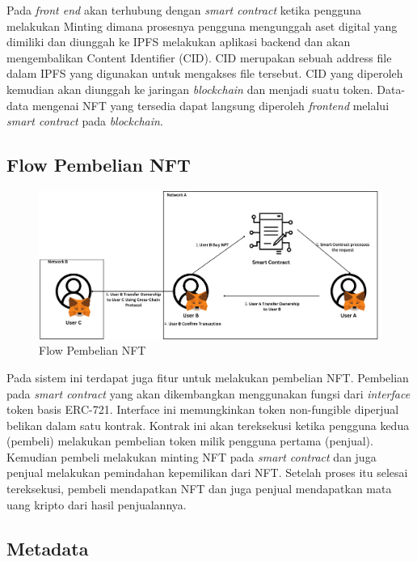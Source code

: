 Pada \emph{front end} akan terhubung dengan \emph{smart contract} ketika pengguna melakukan Minting dimana prosesnya pengguna mengunggah aset digital yang dimiliki dan diunggah ke IPFS melakukan aplikasi backend dan akan mengembalikan Content Identifier (CID). CID merupakan sebuah address file dalam IPFS yang digunakan untuk mengakses file tersebut. CID yang diperoleh kemudian akan diunggah ke jaringan \emph{blockchain} dan menjadi suatu token. Data-data mengenai NFT yang tersedia dapat langsung diperoleh \emph{frontend} melalui \emph{smart contract} pada \emph{blockchain}. 


\subsection{Flow Pembelian NFT}
\begin{figure} [H] \centering
  \includegraphics[scale=0.22]{gambar/flow_transaksi_new.png}
  \caption{Flow Pembelian NFT}
  \label{fig:flowtransaksi}
\end{figure}

Pada sistem ini terdapat juga fitur untuk melakukan pembelian NFT. Pembelian pada \emph{smart contract} yang akan dikembangkan menggunakan fungsi dari \emph{interface} token basis ERC-721. Interface ini memungkinkan token non-fungible diperjual belikan dalam satu kontrak. Kontrak ini akan tereksekusi ketika pengguna kedua (pembeli) melakukan pembelian token milik pengguna pertama (penjual). Kemudian pembeli melakukan minting NFT pada \emph{smart contract} dan juga penjual melakukan pemindahan kepemilikan dari NFT. Setelah proses itu selesai tereksekusi, pembeli mendapatkan NFT dan juga penjual mendapatkan mata uang kripto dari hasil penjualannya.

\subsection{Metadata}

